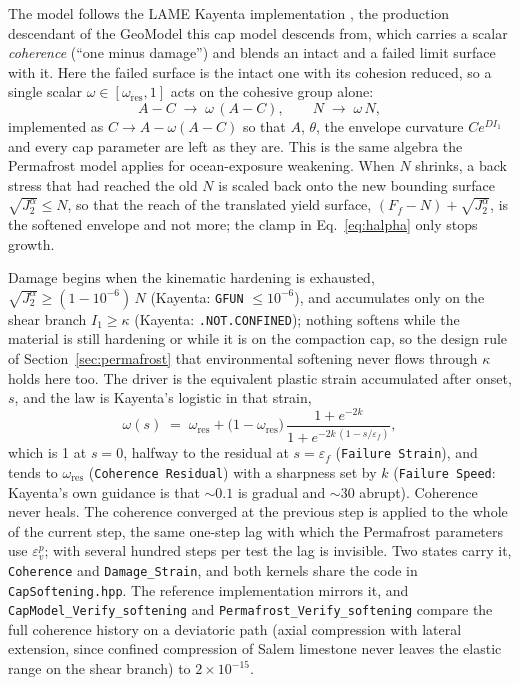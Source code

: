 \documentclass[12pt]{article}
\begin{document}
The model follows the LAME Kayenta implementation
\citep{Brannon.Fossum.Strack:2009}, the production descendant of
the GeoModel this cap model descends from, which carries a scalar
\emph{coherence} (``one minus damage'') and blends an intact and a
failed limit surface with it. Here the failed surface is the intact
one with its cohesion reduced, so a single scalar
$\omega \in [\omega_{\mathrm{res}}, 1]$ acts on the cohesive group
alone:
\begin{equation}
  A - C \;\to\; \omega\,(A - C),
  \qquad
  N \;\to\; \omega\,N,
  \label{eq:coherence-apply}
\end{equation}
implemented as $C \to A - \omega (A - C)$ so that $A$, $\theta$, the
envelope curvature $C e^{D I_1}$ and every cap parameter are left as
they are. This is the same algebra the Permafrost model applies for
ocean-exposure weakening. When $N$ shrinks, a back stress that had
reached the old $N$ is scaled back onto the new bounding surface
$\sqrt{J_2^\alpha} \le N$, so that the reach of the translated yield
surface, $(F_f - N) + \sqrt{J_2^\alpha}$, is the softened envelope
and not more; the clamp in Eq.~\eqref{eq:halpha} only stops growth.

Damage begins when the kinematic hardening is exhausted,
$\sqrt{J_2^\alpha} \ge (1 - 10^{-6})\,N$ (Kayenta: \texttt{GFUN}
$\le 10^{-6}$), and accumulates only on the shear branch
$I_1 \ge \kappa$ (Kayenta: \texttt{.NOT.CONFINED}); nothing softens
while the material is still hardening or while it is on the
compaction cap, so the design rule of Section~\ref{sec:permafrost}
that environmental softening never flows through $\kappa$ holds here
too. The driver is the equivalent plastic strain accumulated after
onset, $s$, and the law is Kayenta's logistic in that strain,
\begin{equation}
  \omega(s) \;=\; \omega_{\mathrm{res}}
    + \bigl(1 - \omega_{\mathrm{res}}\bigr)\,
      \frac{1 + e^{-2k}}{1 + e^{-2k\,(1 - s/\varepsilon_f)}},
  \label{eq:coherence}
\end{equation}
which is 1 at $s = 0$, halfway to the residual at $s = \varepsilon_f$
(\texttt{Failure Strain}), and tends to $\omega_{\mathrm{res}}$
(\texttt{Coherence Residual}) with a sharpness set by $k$
(\texttt{Failure Speed}: Kayenta's own guidance is that $\sim 0.1$ is
gradual and $\sim 30$ abrupt). Coherence never heals. The coherence
converged at the previous step is applied to the whole of the
current step, the same one-step lag with which the Permafrost
parameters use $\varepsilon_v^p$; with several hundred steps per test the lag is
invisible. Two states carry it, \texttt{Coherence} and
\texttt{Damage\_Strain}, and both kernels share the code in
\texttt{CapSoftening.hpp}. The reference implementation mirrors it,
and \texttt{CapModel\_Verify\_softening} and
\texttt{Permafrost\_Verify\_softening} compare the full coherence
history on a deviatoric path (axial compression with lateral
extension, since confined compression of Salem limestone never leaves
the elastic range on the shear branch) to $2\times10^{-15}$.
\end{document}
